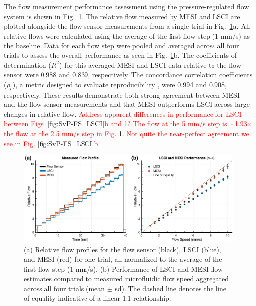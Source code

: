 \documentclass[12pt]{spieman}
\begin{document}
\begin{spacing}{2}
The flow measurement performance assessment using the pressure-regulated flow system is shown in Fig.~\ref{fig:flow_mesi_lsci}. The relative flow measured by MESI and LSCI are plotted alongside the flow sensor measurements from a single trial in Fig.~\ref{fig:flow_mesi_lsci}a. All relative flows were calculated using the average of the first flow step (1 mm/s) as the baseline. Data for each flow step were pooled and averaged across all four trials to assess the overall performance as seen in Fig.~\ref{fig:flow_mesi_lsci}b. The coefficients of determination ($R^2$) for this averaged MESI and LSCI data relative to the flow sensor were 0.988 and 0.839, respectively. The concordance correlation coefficients ($\rho_c$), a metric designed to evaluate reproducibility \cite{Lin.1989}, were 0.994 and 0.908, respectively. These results demonstrate both strong agreement between MESI and the flow sensor measurements and that MESI outperforms LSCI across large changes in relative flow. \textcolor{red}{Address apparent differences in performance for LSCI between Figs. \ref{fig:SvP-FS_LSCI}b and \ref{fig:flow_mesi_lsci}? The flow at the 5 mm/s step is $\sim$1.93$\times$ the flow at the 2.5 mm/s step in Fig. \ref{fig:flow_mesi_lsci}. Not quite the near-perfect agreement we see in Fig. \ref{fig:SvP-FS_LSCI}b.}

\begin{figure}
    \includegraphics[width=\textwidth]{Figure6.pdf}
    \caption {
        (a) Relative flow profiles for the flow sensor (black), LSCI (blue), and MESI (red) for one trial, all normalized to the average of the first flow step (1 mm/s). (b) Performance of LSCI and MESI flow estimates compared to measured microfluidic flow speed aggregated across all four trials (mean $\pm$ sd). The dashed line denotes the line of equality indicative of a linear 1:1 relationship.
    }
    \label{fig:flow_mesi_lsci}
\end{figure}


\end{spacing}
\end{document}
